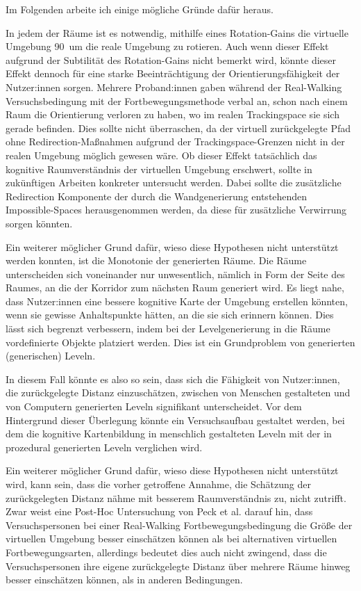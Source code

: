             Im Folgenden arbeite ich einige mögliche Gründe dafür heraus.

            In jedem der Räume ist es notwendig, mithilfe eines Rotation-Gains die virtuelle Umgebung
            90\textdegree\
            um die reale Umgebung zu rotieren. Auch wenn dieser Effekt aufgrund der Subtilität des Rotation-Gains nicht bemerkt wird, könnte dieser Effekt dennoch für eine starke Beeinträchtigung der Orientierungsfähigkeit der Nutzer:innen sorgen. Mehrere Proband:innen gaben während der Real-Walking Versuchsbedingung mit der Fortbewegungsmethode  verbal an, schon nach einem Raum die Orientierung verloren zu haben, wo im realen Trackingspace sie sich gerade befinden. Dies sollte nicht überraschen, da der virtuell zurückgelegte Pfad ohne Redirection-Maßnahmen aufgrund der Trackingspace-Grenzen nicht in der realen Umgebung möglich gewesen wäre. Ob dieser Effekt tatsächlich das kognitive Raumverständnis der virtuellen Umgebung erschwert, sollte in zukünftigen Arbeiten konkreter untersucht werden. Dabei sollte die zusätzliche Redirection Komponente der durch die Wandgenerierung entstehenden Impossible-Spaces herausgenommen werden, da diese für zusätzliche Verwirrung sorgen könnten.

            Ein weiterer möglicher Grund dafür, wieso diese Hypothesen nicht unterstützt werden konnten, ist die Monotonie der generierten Räume.
            Die Räume unterscheiden sich voneinander nur unwesentlich, nämlich in Form der Seite des Raumes, an die der Korridor zum nächsten Raum generiert wird. Es liegt nahe, dass Nutzer:innen eine bessere kognitive Karte der Umgebung erstellen könnten, wenn sie gewisse Anhaltspunkte hätten, an die sie sich erinnern können. Dies lässt sich begrenzt verbessern, indem bei der Levelgenerierung in die Räume vordefinierte Objekte platziert werden. Dies ist ein Grundproblem von generierten (generischen) Leveln.

            In diesem Fall könnte es also so sein, dass sich die Fähigkeit von Nutzer:innen, die zurückgelegte Distanz einzuschätzen, zwischen von Menschen gestalteten und von Computern generierten Leveln signifikant unterscheidet. Vor dem Hintergrund dieser Überlegung könnte ein Versuchsaufbau gestaltet werden, bei dem die kognitive Kartenbildung in menschlich gestalteten Leveln mit der in prozedural generierten Leveln verglichen wird.

            Ein weiterer möglicher Grund dafür, wieso diese Hypothesen nicht unterstützt wird, kann sein, dass die vorher getroffene Annahme, die Schätzung der zurückgelegten Distanz nähme mit besserem Raumverständnis zu, nicht zutrifft.
            Zwar weist eine Post-Hoc Untersuchung von Peck et al. \cite{peck-vergleich-2011} darauf hin, dass Versuchspersonen bei einer Real-Walking Fortbewegungsbedingung die Größe der virtuellen Umgebung besser einschätzen können als bei alternativen virtuellen Fortbewegungsarten, allerdings bedeutet dies auch nicht zwingend, dass die Versuchspersonen ihre eigene zurückgelegte Distanz über mehrere Räume hinweg besser einschätzen können, als in anderen Bedingungen.

